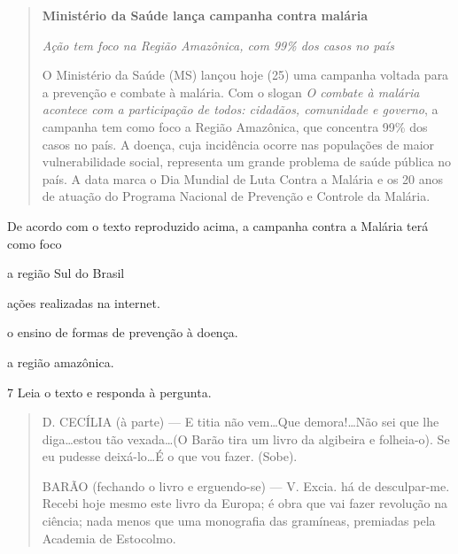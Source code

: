 \begin{quote}
\textbf{Ministério da Saúde lança campanha contra malária}

\textit{Ação tem foco na Região Amazônica, com 99\% dos casos no país}

O Ministério da Saúde (MS) lançou hoje (25) uma campanha voltada para a
prevenção e combate à malária. Com o slogan \textit{O combate à malária acontece
com a participação de todos: cidadãos, comunidade e governo}, a campanha
tem como foco a Região Amazônica, que concentra 99\% dos casos no país. A
doença, cuja incidência ocorre nas populações de maior vulnerabilidade
social, representa um grande problema de saúde pública no país. A data
marca o Dia Mundial de Luta Contra a Malária e os 20 anos de atuação do
Programa Nacional de Prevenção e Controle da Malária.

\end{quote}

De acordo com o texto reproduzido acima, a campanha contra a Malária
terá como foco

\begin{escolha}
  \item a região Sul do Brasil

  \item ações realizadas na internet.

  \item o ensino de formas de prevenção à doença.

  \item a região amazônica.
\end{escolha}

\num{7} Leia o texto e responda à pergunta.

\begin{quote}
D. CECÍLIA (à parte) --- E titia não vem\ldots Que demora!\ldots Não sei
que lhe diga\ldots estou tão vexada\ldots (O Barão tira um livro da algibeira
e folheia-o). Se eu pudesse deixá-lo\ldots É o que vou fazer. (Sobe).

BARÃO (fechando o livro e erguendo-se) --- V. Excia. há de desculpar-me.
Recebi hoje mesmo este livro da Europa; é obra que vai fazer revolução na
ciência; nada menos que uma monografia das gramíneas, premiadas pela 
Academia de Estocolmo.

\end{quote}

